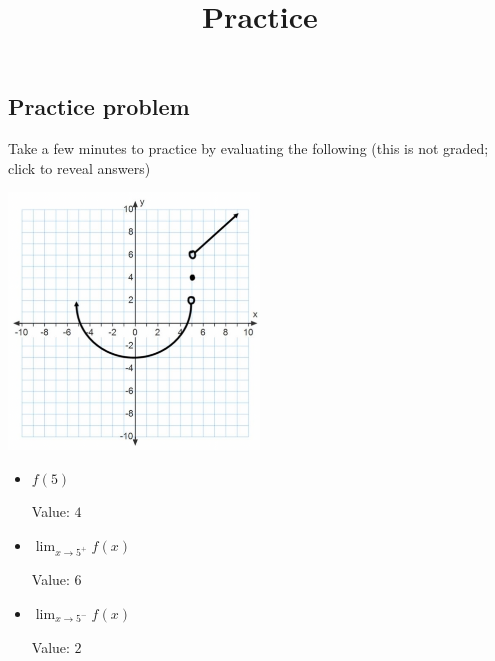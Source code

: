 \documentclass{ximera}
\title{Practice}
\begin{document}
\begin{abstract}
\end{abstract}

\maketitle

\subsection{Practice problem}

Take a few minutes to practice by evaluating the following (this is not graded; click to reveal answers)

\includegraphics[width=0.5\textwidth]{graph2.png}

\begin{itemize}
    \item $f(5)$
    \begin{expandable}
        Value: $4$
    \end{expandable}
    \item $\lim_{x\to5^+} f(x)$
    \begin{foldable}
        Value: $6$
    \end{foldable}
    \item $\lim_{x\to5^-} f(x)$
    \begin{expandable}
        Value: $2$
    \end{expandable}
\end{itemize}
\end{document}
